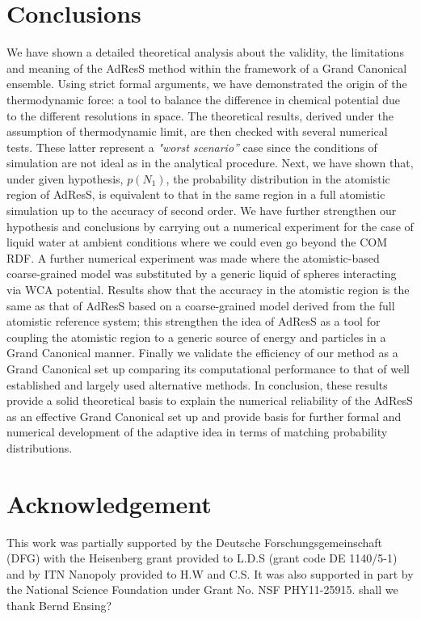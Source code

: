 \documentclass[aip,jcp,a4paper,reprint,onecolumn]{revtex4-1}
\newcommand{\redc}[1]{{\color{red} #1}}
\newcommand{\bluec}[1]{{\color{blue} #1}}
\begin{document}
\section{Conclusions}
We have shown a detailed theoretical analysis about the validity, the limitations and meaning of the AdResS method within the framework of a Grand Canonical ensemble.
Using strict formal arguments, we have demonstrated the origin of the thermodynamic force: a tool to balance the difference in chemical potential due to the different resolutions in space.
  The theoretical results, derived under the assumption of thermodynamic limit, are then checked with several numerical tests. These latter represent a {\it "worst scenario''} case since the conditions of simulation are not ideal as in the analytical procedure.
\redc{Next}, we have shown that, under given hypothesis, $p(N_{1})$, the probability distribution in the atomistic region of AdResS, is equivalent to that in the same region in a full atomistic simulation up to the accuracy of second order. We have further strengthen our hypothesis and conclusions by carrying out a numerical experiment for the case of liquid water at ambient conditions where we could even go beyond the COM RDF. 
A further numerical experiment was made where the atomistic-based coarse-grained model was substituted by a generic liquid of spheres interacting via WCA potential. Results show that the accuracy in the atomistic region is the same as that of AdResS based on a coarse-grained model derived from the full atomistic reference system; this strengthen the idea of AdResS as a tool for coupling the atomistic region to a generic source of energy and particles in a Grand Canonical manner. \redc{Finally we validate the efficiency of our method as a Grand Canonical set up comparing its computational performance to that of well established and largely used alternative methods.} 
In conclusion, these results provide a solid theoretical basis to explain the numerical reliability of the AdResS as an effective Grand Canonical set up and provide basis for further formal and numerical development of the adaptive idea in terms of matching probability distributions.


\section*{Acknowledgement}
This work was partially supported by the Deutsche Forschungsgemeinschaft (DFG) with the Heisenberg grant provided to L.D.S (grant code DE 1140/5-1) and by ITN Nanopoly provided to H.W and C.S.
It was also supported in part by the National Science Foundation under Grant No. NSF PHY11-25915.
\bluec{shall we thank Bernd Ensing?}
\end{document}
